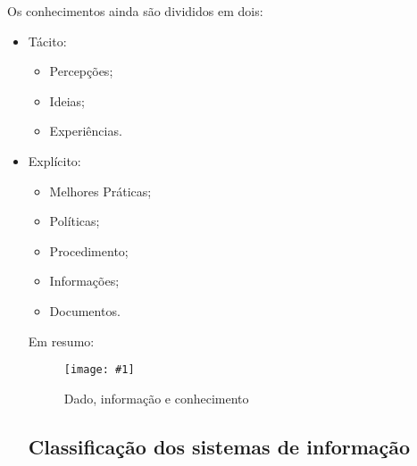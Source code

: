 \documentclass[
	12pt,				%
	openany,			%
	a4paper,			%
	chapter=TITLE,		%
	section=TITLE,		%
	english,
	brazil				%
]{abntex2}
\newcommand{\imagem}[3]{
	\begin{figure}[htb]
		\begin{center}
			\texttt{[image: \#1]}
		\end{center}
		\caption{#2}%
	\end{figure}
}
\begin{document}
\begin{itemize}
Os conhecimentos ainda são divididos em dois:
	\begin{itemize}
		\item Tácito:
			\begin{itemize} 
				\item Percepções;
				\item Ideias;
				\item Experiências.
			\end{itemize}
		\item Explícito:
			\begin{itemize} 
				\item Melhores Práticas;
				\item Políticas;
				\item Procedimento;
				\item Informações;
				\item Documentos.
			\end{itemize}
\newpage
Em resumo:
\imagem{tab_con.png}{Dado, informação e conhecimento}{rótulo_para_referência}

\subsection{Classificação dos sistemas de informação}


\end{itemize}
\end{itemize}
\end{document}
